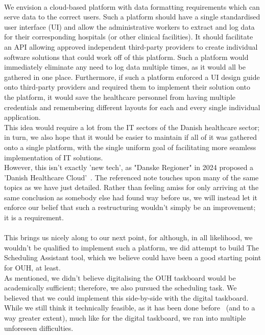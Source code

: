 \\
We envision a cloud-based platform with data formatting requirements which can serve data to the correct users. Such a platform should have a single standardised user interface (UI) and allow the administrative workers to extract and log data for their corresponding hospitals (or other clinical facilities). It should facilitate an API allowing approved independent third-party providers to create individual software solutions that could work off of this platform. Such a platform would immediately eliminate any need to log data multiple times, as it would all be gathered in one place. Furthermore, if such a platform enforced a UI design guide onto third-party providers and required them to implement their solution onto the platform, it would save the healthcare personnel from having multiple credentials and remembering different layouts for each and every single individual application.
\\
This idea would require a lot from the IT sectors of the Danish healthcare sector; in turn, we also hope that it would be easier to maintain if all of it was gathered onto a single platform, with the single uniform goal of facilitating more seamless implementation of IT solutions.
\\
However, this isn't exactly 'new tech', as "Danske Regioner" in 2024 proposed a 'Danish Healthcare Cloud'~\cite{Den-Reg-digitalisation}. The referenced note touches upon many of the same topics as we have just detailed. Rather than feeling amiss for only arriving at the same conclusion as somebody else had found way before us, we will instead let it enforce our belief that such a restructuring wouldn't simply be an improvement; it is a requirement.
\\
\\
This brings us nicely along to our next point, for although, in all likelihood, we wouldn't be qualified to implement such a platform, we did attempt to build The Scheduling Assistant tool, which we believe could have been a good starting point for OUH, at least.
\\
As mentioned, we didn't believe digitalising the OUH taskboard would be academically sufficient; therefore, we also pursued the scheduling task. We believed that we could implement this side-by-side with the digital taskboard. While we still think it technically feasible, as it has been done before~\cite{you-but-better} (and to a way greater extent), much like for the digital taskboard, we ran into multiple unforeseen difficulties.
\\
